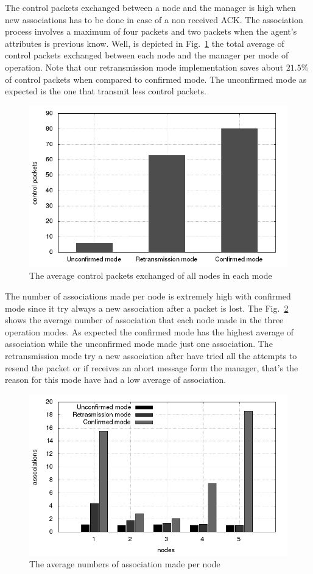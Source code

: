 The control packets exchanged between a node and the manager is high when new associations has to be done in case of a non received ACK. The association process involves a maximum of four packets and two packets when the agent's attributes is previous know. Well, is depicted in Fig.~\ref{fig:controlpacketsexchanged} the total average of control packets exchanged between each node and the manager per mode of operation. Note that our retransmission mode implementation saves about $21.5\%$ of control packets when compared to confirmed mode. The unconfirmed mode as expected is the one that transmit less control packets.

\begin{figure}[htbp]
\centerline{\includegraphics[scale=0.4]{figures/averagecontrolpacketsexchanged.png}}
\caption{The average control packets exchanged of all nodes in each mode}
\label{fig:controlpacketsexchanged}
\end{figure}

The number of associations made per node is extremely high with confirmed mode since it try always a new association after a packet is lost. The Fig.~\ref{fig:associationnumber} shows the average number of association that each node made in the three operation modes. As expected the confirmed mode has the highest average of association while the unconfirmed mode made just one association. The retransmission mode try a new association after have tried all the attempts to resend the packet or if receives an abort message form the manager, that's the reason for this mode have had a low average of association.   

\begin{figure}[htbp]
\centerline{\includegraphics[scale=0.4]{figures/averagetotalassociationsmade.png}}
\caption{The average numbers of association made per node}
\label{fig:associationnumber}
\end{figure}